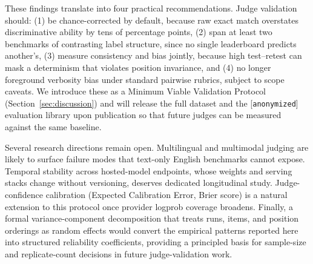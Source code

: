 \documentclass[11pt]{article}
\begin{document}
These findings translate into four practical recommendations. Judge validation should: (1) be chance-corrected by default, because raw exact match overstates discriminative ability by tens of percentage points, (2) span at least two benchmarks of contrasting label structure, since no single leaderboard predicts another's, (3) measure consistency and bias jointly, because high test--retest can mask a determinism that violates position invariance, and (4) no longer foreground verbosity bias under standard pairwise rubrics, subject to scope caveats. We introduce these as a Minimum Viable Validation Protocol (Section~\ref{sec:discussion}) and will release the full dataset and the [\texttt{anonymized}] evaluation library upon publication so that future judges can be measured against the same baseline.



Several research directions remain open. Multilingual and multimodal judging are likely to surface failure modes that text-only English benchmarks cannot expose. Temporal stability across hosted-model endpoints, whose weights and serving stacks change without versioning, deserves dedicated longitudinal study. Judge-confidence calibration (Expected Calibration Error, Brier score) is a natural extension to this protocol once provider logprob coverage broadens. Finally, a formal variance-component decomposition that treats runs, items, and position orderings as random effects would convert the empirical patterns reported here into structured reliability coefficients, providing a principled basis for sample-size and replicate-count decisions in future judge-validation work.
\end{document}

